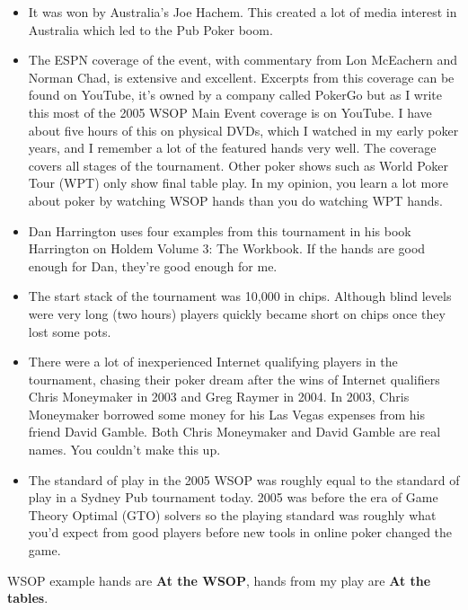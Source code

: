 \begin{itemize}
  \item It was won by Australia's Joe Hachem. This created a lot of
    media interest in Australia which led to the Pub Poker boom.
  \item The ESPN coverage of the event, with commentary from
    Lon McEachern and Norman Chad, is extensive and
    excellent. Excerpts from this coverage can be found on
    YouTube, it's owned by a company called PokerGo but as I write
    this most of the 2005 WSOP Main Event coverage is on YouTube.
    I have about five hours of this on physical DVDs, which I watched
    in my early poker years, and I remember a lot
    of the featured hands very well. The coverage covers all stages of
    the tournament. Other poker shows such as World Poker Tour (WPT)
    only show final table play. In my opinion, you learn a lot more
    about poker by watching WSOP hands than you do watching WPT hands.
  \item Dan Harrington uses four examples from this tournament in his
    book Harrington on Holdem Volume 3: The Workbook. If the hands are
    good enough for Dan, they're good enough for me.
  \item The start stack of the tournament was 10,000 in
    chips. Although blind levels were very long (two hours)
    players quickly became short on chips once they lost some pots.
  \item There were a lot of inexperienced Internet qualifying players
    in the tournament, chasing their poker dream after the wins of
    Internet qualifiers Chris Moneymaker in 2003 and Greg Raymer in 2004.
    In 2003, Chris Moneymaker borrowed some money for his Las Vegas
    expenses from his friend David Gamble. Both Chris Moneymaker and
    David Gamble are real names. You couldn't make this up.
  \item The standard of play in the 2005 WSOP was roughly equal to the
    standard of play in a Sydney Pub tournament today. 2005 was before
    the era of Game Theory Optimal (GTO) solvers so the playing
    standard was roughly what you'd expect from good players before
    new tools in online poker changed the game.

\end{itemize}

WSOP example hands are \textbf{At the WSOP}, hands from my play are
\textbf{At the tables}.


